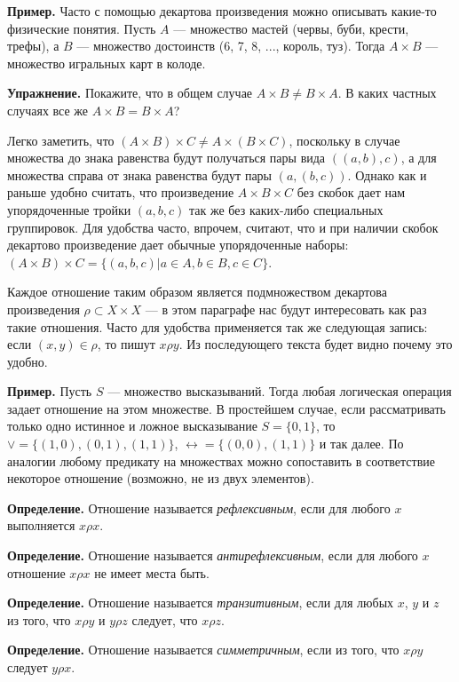 {\bfseries Пример.} Часто с помощью декартова произведения можно описывать какие-то физические понятия. Пусть $A$ — множество мастей (червы, буби, крести, трефы), а $B$ — множество достоинств (6, 7, 8, ..., король, туз). Тогда $A \times B$ — множество игральных карт в колоде.

{\bfseries Упражнение.} Покажите, что в общем случае $A\times B \not = B \times A$. В каких частных случаях все же $A\times B = B \times A$?

Легко заметить, что $(A\times B)\times C \not= A\times (B \times C)$, поскольку в случае множества до знака равенства будут получаться пары вида $((a, b), c)$, а для множества справа от знака равенства будут пары $(a, (b, c))$. Однако как и раньше удобно считать, что произведение $A\times B\times C$ без скобок дает нам упорядоченные тройки $(a, b, c)$ так же без каких-либо специальных группировок. Для удобства часто, впрочем, считают, что и при наличии скобок декартово произведение дает обычные упорядоченные наборы: $(A\times B)\times C = \{(a, b, c)|a\in A, b\in B, c\in C\}$.

Каждое отношение таким образом является подмножеством декартова произведения $\rho \subset X\times X$ — в этом параграфе нас будут интересовать как раз такие отношения. Часто для удобства применяется так же следующая запись: если $(x, y) \in \rho$, то пишут $x\rho y$. Из последующего текста будет видно почему это удобно.

{\bfseries Пример.} Пусть $S$ — множество высказываний. Тогда любая логическая операция задает отношение на этом множестве. В простейшем случае, если рассматривать только одно истинное и ложное высказывание $S = \{0, 1\}$, то $\vee = \{(1, 0), (0, 1), (1, 1)\}$, $\leftrightarrow = \{(0, 0), (1, 1)\}$ и так далее. По аналогии любому предикату на множествах можно сопоставить в соответствие некоторое отношение (возможно, не из двух элементов).

{\bfseries Определение.} Отношение называется {\slshape рефлексивным}, если для любого $x$ выполняется $x\rho x$.

{\bfseries Определение.} Отношение называется {\slshape антирефлексивным}, если для любого $x$ отношение $x\rho x$ не имеет места быть.

{\bfseries Определение.} Отношение называется {\slshape транзитивным}, если для любых $x$, $y$ и $z$ из того, что $x\rho y$ и $y \rho z$ следует, что $x\rho z$.

{\bfseries Определение.} Отношение называется {\slshape симметричным}, если из того, что $x\rho y$ следует $y\rho x$.

